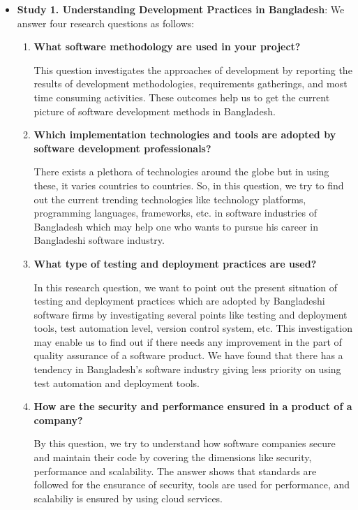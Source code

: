 \begin{itemize}[leftmargin=10pt]

\item \textbf{Study  1. Understanding Development Practices in Bangladesh}: We answer four research questions as follows:
    \begin{enumerate}[label={\textbf{RQ\arabic{*}.}}, leftmargin=30pt]
    
    \item \textbf{What software methodology are used in your project?}
    
    This question investigates the approaches of development by reporting the results of development methodologies, requirements gatherings, and most time consuming activities. These outcomes help us to get the current picture of software development methods in Bangladesh.
        
    \item \textbf{Which implementation technologies and tools are adopted by software development professionals?}
        
    There exists a plethora of technologies around the globe but in using these, it varies countries to countries. So, in this question, we try to find out the current trending technologies like technology platforms, programming languages, frameworks, etc. in software industries of Bangladesh which may help one who wants to pursue his career in Bangladeshi software industry.
        
    \item \textbf{What type of testing and deployment practices are used?}
        
    In this research question, we want to point out the present situation of testing and deployment practices which are adopted by Bangladeshi software firms by investigating several points like testing and deployment tools, test automation level, version control system, etc. This investigation may enable us to find out if there needs any improvement in the part of quality assurance of a software product. We have found that there has a tendency in Bangladesh's software industry giving less priority on using test automation and deployment tools.
        
    \item \textbf{How are the security and performance ensured in a product of a company?}
        
    By this question, we try to understand how software companies secure and maintain their code by covering the dimensions like security, performance and scalability. The answer shows that standards are followed for the ensurance of security, tools are used for performance, and scalabiliy is ensured by using cloud services.
        

\end{enumerate}
\end{itemize}
